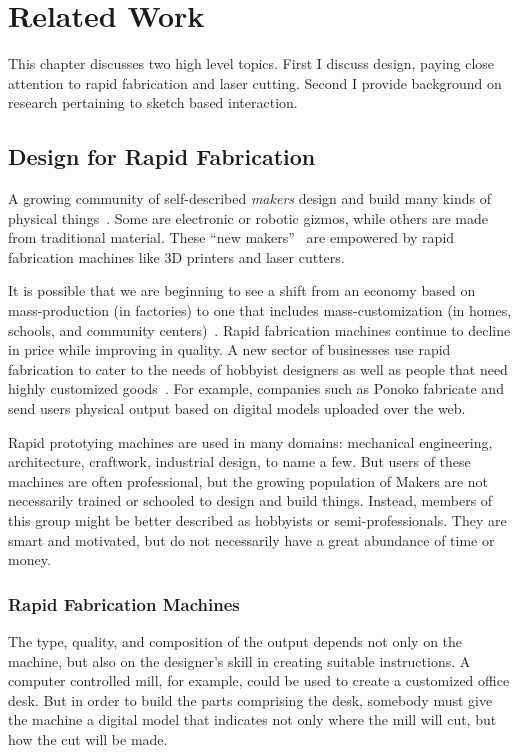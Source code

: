 \chapter{Related Work}

This chapter discusses two high level topics. First I discuss design,
paying close attention to rapid fabrication and laser cutting. Second
I provide background on research pertaining to sketch based interaction.

\section{Design for Rapid Fabrication}

A growing community of self-described \textit{makers} design and build
many kinds of physical things~\cite{gershenfeld-fab}. Some are
electronic or robotic gizmos, while others are made from traditional
material. These ``new makers''~\cite{gross-new-makers} are empowered
by rapid fabrication machines like 3D printers and laser cutters.

It is possible that we are beginning to see a shift from an economy
based on mass-production (in factories) to one that includes
mass-customization (in homes, schools, and community
centers)~\cite{economist-fab}. Rapid fabrication machines continue to
decline in price while improving in quality. A new sector of
businesses use rapid fabrication to cater to the needs of hobbyist
designers as well as people that need highly customized
goods~\cite{paulos-citizenscience}. For example, companies such as
Ponoko fabricate and send users physical output based on digital
models uploaded over the web.

Rapid prototying machines are used in many domains: mechanical
engineering, architecture, craftwork, industrial design, to name a
few. But users of these machines are often professional, but the
growing population of Makers are not necessarily trained or schooled
to design and build things. Instead, members of this group might be
better described as hobbyists or semi-professionals. They are smart
and motivated, but do not necessarily have a great abundance of time
or money.

\subsection{Rapid Fabrication Machines}

The type, quality, and composition of the output depends not only on
the machine, but also on the designer's skill in creating suitable
instructions. A computer controlled mill, for example, could be used
to create a customized office desk. But in order to build the parts
comprising the desk, somebody must give the machine a digital model
that indicates not only where the mill will cut, but how the cut will
be made.

